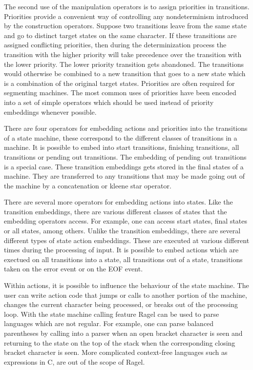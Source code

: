 \documentclass[letterpaper,11pt,oneside]{book}
\begin{document}
The second use of the manipulation operators is to assign priorities in
transitions. Priorities provide a convenient way of controlling any
nondeterminism introduced by the construction operators. Suppose two
transitions leave from the same state and go to distinct target states on the
same character. If these transitions are assigned conflicting priorities, then
during the determinization process the transition with the higher priority will
take precedence over the transition with the lower priority. The lower priority
transition gets abandoned. The transitions would otherwise be combined to a new
transition that goes to a new state which is a combination of the original
target states. Priorities are often required for segmenting machines. The most
common uses of priorities have been encoded into a set of simple operators
which should be used instead of priority embeddings whenever possible.

There are four operators for embedding actions and priorities into the
transitions of a state machine, these correspond to the different
classes of transitions in a machine. It is possible to embed into start
transitions, finishing transitions, all transitions or pending out
transitions.  The embedding of pending out transitions is a special case.
These transition embeddings gets stored in the final states of a machine.  They
are transferred to any transitions that may be made going out of the machine by
a concatenation or kleene star operator.

There are several more operators for embedding actions into states. Like the
transition embeddings, there are various different classes of states that the
embedding operators access. For example, one can access start states, final
states or all states, among others. Unlike the transition
embeddings, there
are several different types of state action embeddings. These are executed at various
different times during the processing of input. It is possible to embed
actions which are exectued on all transitions into a state, all transitions out of a state,
transitions taken on the error event or on the EOF event.

Within actions, it is possible to influence the behaviour of the state machine.
The user can write action code that jumps or calls to another portion of the
machine, changes the current character being processed, or breaks out of the
processing loop. With the state machine calling feature Ragel can be used to
parse languages which are not regular. For example, one can parse balanced
parentheses by calling into a parser when an open bracket character is seen and
returning to the state on the top of the stack when the corresponding closing
bracket character is seen. More complicated context-free languages such as
expressions in C, are out of the scope of Ragel. 
\end{document}

